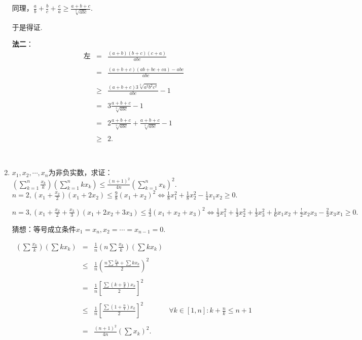 \documentclass[8pt]{article}
\begin{document}
\begin{enumerate}
			同理，$\displaystyle \frac{a}{b}+\frac{b}{c}+\frac{c}{a}\geq\frac{a+b+c}{\sqrt[3]{abc}}.$

			于是得证.

			\textbf{法二}：
			$$
			\begin{array}{rcl}
				\text{左}&=&\displaystyle \frac{(a+b)(b+c)(c+a)}{abc}\\\\
				&=&\displaystyle \frac{(a+b+c)(ab+bc+ca)-abc}{abc}\\\\
				&\geq&\displaystyle\frac{(a+b+c)3\sqrt[3]{a^2b^2c^2}}{abc}-1\\\\
				&=&3\displaystyle\frac{a+b+c}{\sqrt[3]{abc}}-1\\\\
				&=&2\displaystyle \frac{a+b+c}{\sqrt[3]{abc}}+\frac{a+b+c}{\sqrt[3]{abc}}-1\\\\
				&\geq&2.
			\end{array}
			$$

		~\\

		\item $x_1, x_2, \cdots, x_n$为非负实数，求证：$\displaystyle \left(\sum_{k=1}^{n}\frac{x_k}{k}\right)\left(\sum_{k=1}^{n}kx_k\right)\leq\frac{(n+1)^2}{4n}\left(\sum_{k=1}^n x_k\right)^2$.
			~\\

			$n=2, \displaystyle \left(x_1+\frac{x_2}{2}\right)\left(x_1+2x_2\right)\leq\frac{9}{8}(x_1+x_2)^2 \Leftrightarrow \frac{1}{8}x_1^2+\frac{1}{8}x_2^2-\frac{1}{4}x_1 x_2\geq 0.$

			$n=3, \displaystyle \left(x_1+\frac{x_2}{2}+\frac{x_3}{3}\right)\left(x_1+2x_2+3x_3\right)\leq\frac{4}{3}(x_1+x_2+x_3)^2 \Leftrightarrow \frac{1}{3}x_1^2+\frac{1}{3}x_2^2+\frac{1}{3}x_3^2+\frac{1}{6}x_1x_2+\frac{!}{2}x_2x_3-\frac{2}{3}x_3x_1\geq 0.$

			猜想：等号成立条件$x_1=x_n, x_2=\cdots=x_{n-1}=0$.

			$$
			\begin{array}{rclr}
				\displaystyle \left(\sum \frac{x_k}{k}\right)\left(\sum k x_k\right)&=&\displaystyle \frac{1}{n}\left(n\sum\frac{x_k}{k}\right)\left(\sum k x_k\right)\\\\
				&\leq&\displaystyle \frac{1}{n}\left(\frac{n\sum\frac{x_k}{k}+\sum kx_k}{2}\right)^2\\\\
				&=&\displaystyle \frac{1}{n}\left[\frac{\sum \left(k+\frac{n}{k}\right)x_k}{2}\right]^2\\\\
				&\leq&\displaystyle \frac{1}{n}\left[\frac{\sum \left(1+\frac{n}{1}\right)x_k}{2}\right]^2&\displaystyle \forall k\in[1, n]: k+\frac{n}{k}\leq n+1\\\\
				&=&\displaystyle \frac{(n+1)^2}{4n} \left(\sum x_k\right)^2.
			\end{array}
			$$


\end{enumerate}
\end{document}
